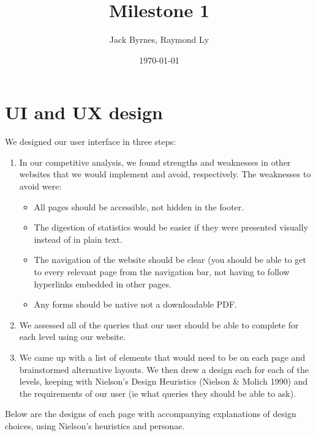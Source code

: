 \documentclass[12pt, a4paper]{article}
\title{Milestone 1}
\author{Jack Byrnes, Raymond Ly}
\date{\today}
\begin{document}
\maketitle
\tableofcontents
\section{UI and UX design}
We designed our user interface in three steps:
\begin{enumerate}
\item In our competitive analysis, we found strengths and weaknesses in other websites that we would implement and avoid, respectively. 
The weaknesses to avoid were:
\begin{itemize}
\item All pages should be accessible, not hidden in the footer. 
\item The digestion of statistics would be easier if they were presented visually instead of in plain text. 
\item The navigation of the website should be clear (you should be able to get to every relevant page from the navigation bar, not having to follow hyperlinks embedded in other pages. 
\item Any forms should be native not a downloadable PDF. 
\end{itemize}
\item We assessed all of the queries that our user should be able to complete for each level using our website.
\item We came up with a list of elements that would need to be on each page and brainstormed alternative layouts. We then drew a design each for each of the levels, keeping with Nielson's Design Heuristics (Nielson \& Molich 1990) and the requirements of our user (ie what queries they should be able to ask).
\end{enumerate}
Below are the designs of each page with accompanying explanations of design choices, using Nielson's heuristics and personae.
\end{document}

